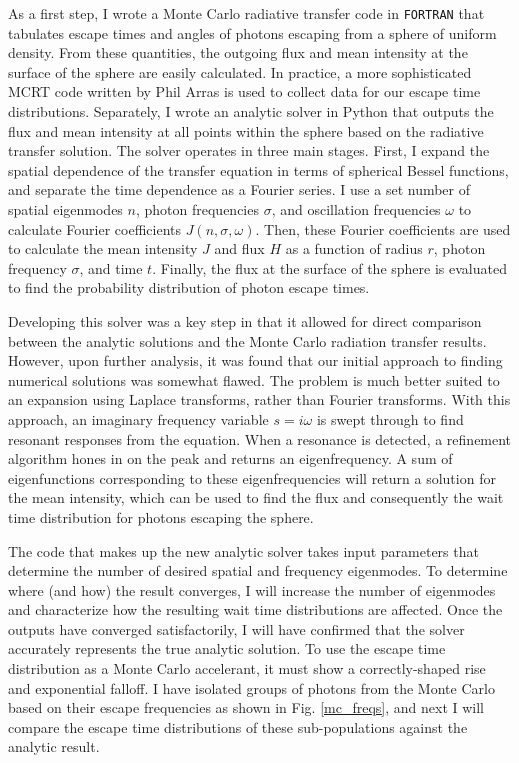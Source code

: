\documentclass[onecolumn]{aastex63}
\begin{document}
As a first step, I wrote a Monte Carlo radiative transfer code in \texttt{FORTRAN} that tabulates escape times and angles of photons escaping from a sphere of uniform density. From these quantities, the outgoing flux and mean intensity at the surface of the sphere are easily calculated. In practice, a more sophisticated MCRT code written by Phil Arras is used to collect data for our escape time distributions. Separately, I wrote an analytic solver in Python that outputs the flux and mean intensity at all points within the sphere based on the radiative transfer solution. The solver operates in three main stages. First, I expand the spatial dependence of the transfer equation in terms of spherical Bessel functions, and separate the time dependence as a Fourier series. I use a set number of spatial eigenmodes $n$, photon frequencies $\sigma$, and oscillation frequencies $\omega$ to calculate Fourier coefficients $J(n, \sigma, \omega)$. Then, these Fourier coefficients are used to calculate the mean intensity $J$ and flux $H$ as a function of radius $r$, photon frequency $\sigma$, and time $t$. Finally, the flux at the surface of the sphere is evaluated to find the probability distribution of photon escape times.

Developing this solver was a key step in that it allowed for direct comparison between the analytic solutions and the Monte Carlo radiation transfer results. However, upon further analysis, it was found that our initial approach to finding numerical solutions was somewhat flawed. The problem is much better suited to an expansion using Laplace transforms, rather than Fourier transforms. With this approach, an imaginary frequency variable $s = i\omega$ is swept through to find resonant responses from the equation. When a resonance is detected, a refinement algorithm hones in on the peak and returns an eigenfrequency. A sum of eigenfunctions corresponding to these eigenfrequencies will return a solution for the mean intensity, which can be used to find the flux and consequently the wait time distribution for photons escaping the sphere.

The code that makes up the new analytic solver takes input parameters that determine the number of desired spatial and frequency eigenmodes. To determine where (and how) the result converges, I will increase the number of eigenmodes and characterize how the resulting wait time distributions are affected. Once the outputs have converged satisfactorily, I will have confirmed that the solver accurately represents the true analytic solution. To use the escape time distribution as a Monte Carlo accelerant, it must show a correctly-shaped rise and exponential falloff. I have isolated groups of photons from the Monte Carlo based on their escape frequencies as shown in Fig. \ref{mc_freqs}, and next I will compare the escape time distributions of these sub-populations against the analytic result.
\end{document}
